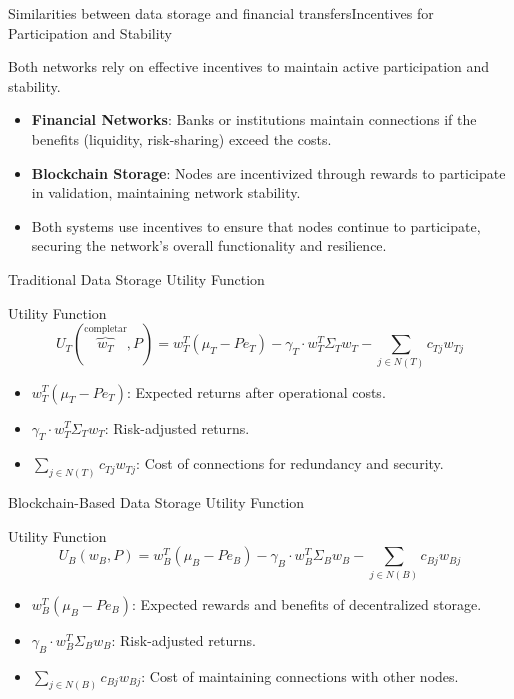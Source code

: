 \documentclass[aspectratio=169]{beamer}
\begin{document}
    \begin{frame}{Similarities between data storage and financial transfers}{Incentives for Participation and Stability}
        
    Both networks rely on effective incentives to maintain active participation and stability.
    \vspace{3mm}
        
    \begin{itemize}
        \item \textbf{Financial Networks}: Banks or institutions maintain connections if the benefits (liquidity, risk-sharing) exceed the costs.
        \item \textbf{Blockchain Storage}: Nodes are incentivized through rewards to participate in validation, maintaining network stability.
        \item Both systems use incentives to ensure that nodes continue to participate, securing the network's overall functionality and resilience.
    \end{itemize}
    \end{frame}
    
    \begin{frame}{Traditional Data Storage Utility Function}
        \begin{block}{Utility Function}
        \[
        U_T(\overbrace{w_T}^\text{completar}, P) = w_T^T (\mu_T - P e_T) - \gamma_T \cdot w_T^T \Sigma_T w_T - \sum_{j \in N(T)} c_{Tj} w_{Tj}
        \]
        \end{block}
        \begin{itemize}
            \item \( w_T^T (\mu_T - P e_T) \): Expected returns after operational costs.
            \item \( \gamma_T \cdot w_T^T \Sigma_T w_T \): Risk-adjusted returns.
            \item \( \sum_{j \in N(T)} c_{Tj} w_{Tj} \): Cost of connections for redundancy and security.
        \end{itemize}
    \end{frame}
    
    \begin{frame}{Blockchain-Based Data Storage Utility Function}
        \begin{block}{Utility Function}
        \[
        U_B(w_B, P) = w_B^T (\mu_B - P e_B) - \gamma_B \cdot w_B^T \Sigma_B w_B - \sum_{j \in N(B)} c_{Bj} w_{Bj}
        \]
        \end{block}
        \begin{itemize}
            \item \( w_B^T (\mu_B - P e_B) \): Expected rewards and benefits of decentralized storage.
            \item \( \gamma_B \cdot w_B^T \Sigma_B w_B \): Risk-adjusted returns.
            \item \( \sum_{j \in N(B)} c_{Bj} w_{Bj} \): Cost of maintaining connections with other nodes.
        \end{itemize}
    \end{frame}
    
\end{document}
